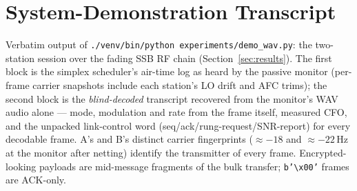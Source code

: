 \section{System-Demonstration Transcript}
\label{app:demo}

Verbatim output of
\texttt{./venv/bin/python experiments/demo\_wav.py}: the two-station
session over the fading SSB RF chain
(Section~\ref{sec:results}).  The first block is the simplex
scheduler's air-time log as heard by the passive monitor (per-frame
carrier snapshots include each station's LO drift and AFC trims); the
second block is the \emph{blind-decoded} transcript recovered from the
monitor's WAV audio alone --- mode, modulation and rate from the frame
itself, measured CFO, and the unpacked link-control word
(seq/ack/rung-request/SNR-report) for every decodable frame.  A's and
B's distinct carrier fingerprints ($\approx -18$ and $\approx
-22$\,Hz at the monitor after netting) identify the transmitter of
every frame.  Encrypted-looking payloads are mid-message fragments of
the bulk transfer; \texttt{b'\textbackslash x00'} frames are ACK-only.


